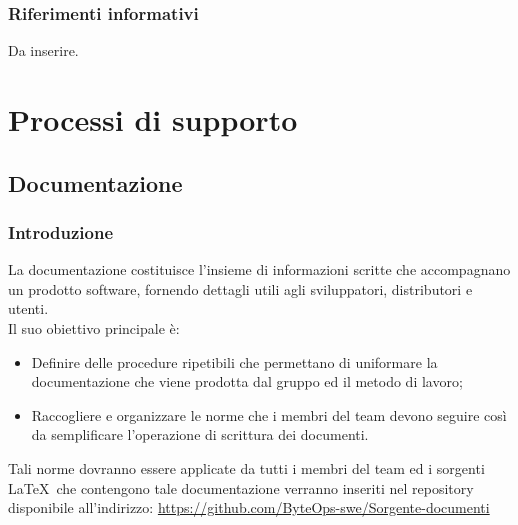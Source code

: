 \documentclass{article}
\begin{document}
\subsubsection{Riferimenti informativi}
Da inserire.

\section{Processi di supporto}

\subsection{Documentazione}

\subsubsection{Introduzione}
La documentazione costituisce l'insieme di informazioni scritte che accompagnano un prodotto software, fornendo dettagli utili agli sviluppatori, distributori e utenti.\\
Il suo obiettivo principale è:
\begin{itemize}
    \item  Definire delle procedure ripetibili che permettano di uniformare la documentazione che viene prodotta dal gruppo ed il metodo di lavoro;
    \item  Raccogliere e organizzare le norme che i membri del team devono seguire così da semplificare l'operazione di scrittura dei documenti.
\end{itemize}
Tali norme dovranno essere applicate da tutti i membri del team ed i sorgenti \LaTeX\ che contengono tale documentazione verranno inseriti nel repository disponibile all'indirizzo:
\href{https://github.com/ByteOps-swe/Sorgente-documenti}{https://github.com/ByteOps-swe/Sorgente-documenti}

\end{document}
